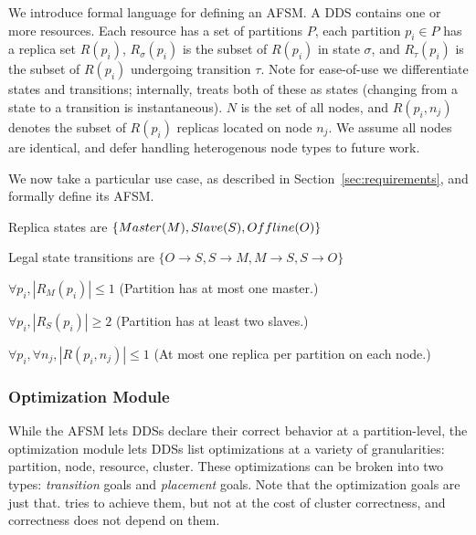 We introduce formal language for defining an AFSM.
A DDS contains one or more resources. Each resource has a set of partitions $P$,
each partition $p_i \in P$ has a replica set $R(p_i)$, $R_\sigma(p_i)$ is the subset of $R(p_i)$ in state $\sigma$, and 
$R_\tau(p_i)$ is the subset of $R(p_i)$ undergoing transition $\tau$.  Note for
ease-of-use we differentiate states and transitions; internally, \helix treats both
of these as states (changing from a state to a transition is instantaneous).
$N$ is the set of all nodes, and $R(p_i, n_j)$ denotes the subset of $R(p_i)$
replicas located on
node $n_j$.  We assume all nodes are identical, and defer handling heterogenous
node types to future work.

We now take a particular use case, \ES as described in
Section~\ref{sec:requirements}, and formally define its AFSM.
\be
\item Replica states are $\{Master (M), Slave (S), \\ Offline(O)\}$
\item Legal state transitions are $\{O \rightarrow S, S \rightarrow M,
M \rightarrow S, S \rightarrow O\}$  
\item $\forall p_i, |R_M(p_i)| \le 1$  (Partition has at most one master.)
\item $\forall p_i, |R_S(p_i)| \ge 2$  (Partition has at least two slaves.)   
\item $\forall p_i, \forall n_j, |R(p_i, n_j)| \le 1$ (At most one replica per partition
on each node.)
\ee
{}%

\subsubsection{Optimization Module}
%
While the AFSM lets DDSs declare their correct behavior at a partition-level, the optimization module
lets DDSs list optimizations at a variety of granularities: partition, node,
resource, cluster.  These optimizations can be broken into two types:
\emph{transition} goals and \emph{placement} goals.
Note that the optimization goals are just that.  \helix tries to achieve them,
but not at the cost of cluster correctness, and correctness does not depend on
them. 

